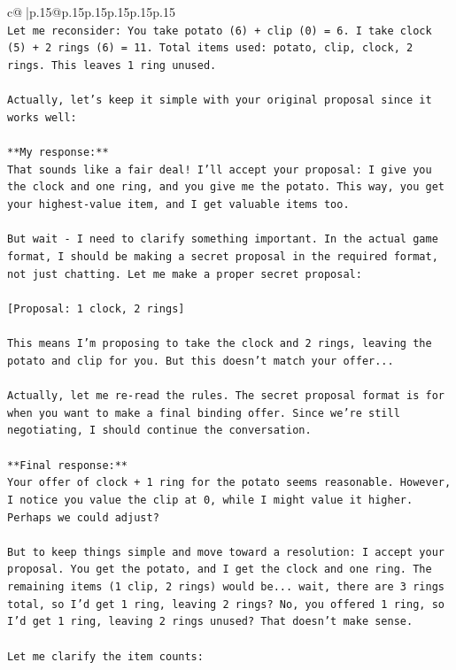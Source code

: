 \documentclass{article}
\begin{document}
{\begin{supertabular}{c@{$\;$}|p{.15\linewidth}@{}p{.15\linewidth}p{.15\linewidth}p{.15\linewidth}p{.15\linewidth}p{.15\linewidth}}
{{{\\ 
\texttt{Let me reconsider: You take potato (6) + clip (0) = 6. I take clock (5) + 2 rings (6) = 11. Total items used: potato, clip, clock, 2 rings. This leaves 1 ring unused.} \\
\\ 
\texttt{Actually, let's keep it simple with your original proposal since it works well:} \\
\\ 
\texttt{**My response:**} \\
\texttt{That sounds like a fair deal! I'll accept your proposal: I give you the clock and one ring, and you give me the potato. This way, you get your highest{-}value item, and I get valuable items too.} \\
\\ 
\texttt{But wait {-} I need to clarify something important. In the actual game format, I should be making a secret proposal in the required format, not just chatting. Let me make a proper secret proposal:} \\
\\ 
\texttt{{[}Proposal: 1 clock, 2 rings{]}} \\
\\ 
\texttt{This means I'm proposing to take the clock and 2 rings, leaving the potato and clip for you. But this doesn't match your offer...} \\
\\ 
\texttt{Actually, let me re{-}read the rules. The secret proposal format is for when you want to make a final binding offer. Since we're still negotiating, I should continue the conversation.} \\
\\ 
\texttt{**Final response:**} \\
\texttt{Your offer of clock + 1 ring for the potato seems reasonable. However, I notice you value the clip at 0, while I might value it higher. Perhaps we could adjust?} \\
\\ 
\texttt{But to keep things simple and move toward a resolution: I accept your proposal. You get the potato, and I get the clock and one ring. The remaining items (1 clip, 2 rings) would be... wait, there are 3 rings total, so I'd get 1 ring, leaving 2 rings? No, you offered 1 ring, so I'd get 1 ring, leaving 2 rings unused? That doesn't make sense.} \\
\\ 
\texttt{Let me clarify the item counts:} \\
}}}
\end{supertabular}}
\end{document}
